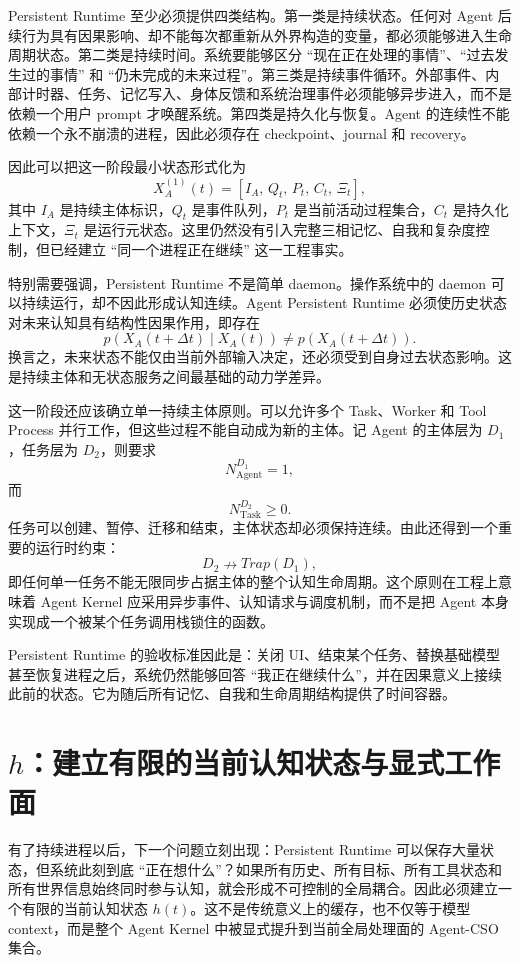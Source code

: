 Persistent Runtime 至少必须提供四类结构。第一类是持续状态。任何对 Agent 后续行为具有因果影响、却不能每次都重新从外界构造的变量，都必须能够进入生命周期状态。第二类是持续时间。系统要能够区分 ``现在正在处理的事情''、``过去发生过的事情'' 和 ``仍未完成的未来过程''。第三类是持续事件循环。外部事件、内部计时器、任务、记忆写入、身体反馈和系统治理事件必须能够异步进入，而不是依赖一个用户 prompt 才唤醒系统。第四类是持久化与恢复。Agent 的连续性不能依赖一个永不崩溃的进程，因此必须存在 checkpoint、journal 和 recovery。

因此可以把这一阶段最小状态形式化为
\[
X_A^{(1)}(t)
=
\left[
I_A,\,
Q_t,\,
P_t,\,
C_t,\,
\Xi_t
\right],
\]
其中 $I_A$ 是持续主体标识，$Q_t$ 是事件队列，$P_t$ 是当前活动过程集合，$C_t$ 是持久化上下文，$\Xi_t$ 是运行元状态。这里仍然没有引入完整三相记忆、自我和复杂度控制，但已经建立 ``同一个进程正在继续'' 这一工程事实。

特别需要强调，Persistent Runtime 不是简单 daemon。操作系统中的 daemon 可以持续运行，却不因此形成认知连续。Agent Persistent Runtime 必须使历史状态对未来认知具有结构性因果作用，即存在
\[
p(X_A(t+\Delta t)\mid X_A(t))
\neq
p(X_A(t+\Delta t)).
\]
换言之，未来状态不能仅由当前外部输入决定，还必须受到自身过去状态影响。这是持续主体和无状态服务之间最基础的动力学差异。

这一阶段还应该确立单一持续主体原则。可以允许多个 Task、Worker 和 Tool Process 并行工作，但这些过程不能自动成为新的主体。记 Agent 的主体层为 $D_1$，任务层为 $D_2$，则要求
\[
N_{\mathrm{Agent}}^{D_1}=1,
\]
而
\[
N_{\mathrm{Task}}^{D_2}\geq 0.
\]
任务可以创建、暂停、迁移和结束，主体状态却必须保持连续。由此还得到一个重要的运行时约束：
\[
D_2\nrightarrow Trap(D_1),
\]
即任何单一任务不能无限同步占据主体的整个认知生命周期。这个原则在工程上意味着 Agent Kernel 应采用异步事件、认知请求与调度机制，而不是把 Agent 本身实现成一个被某个任务调用栈锁住的函数。

Persistent Runtime 的验收标准因此是：关闭 UI、结束某个任务、替换基础模型甚至恢复进程之后，系统仍然能够回答 ``我正在继续什么''，并在因果意义上接续此前的状态。它为随后所有记忆、自我和生命周期结构提供了时间容器。

\section{$h$：建立有限的当前认知状态与显式工作面}

有了持续进程以后，下一个问题立刻出现：Persistent Runtime 可以保存大量状态，但系统此刻到底 ``正在想什么''？如果所有历史、所有目标、所有工具状态和所有世界信息始终同时参与认知，就会形成不可控制的全局耦合。因此必须建立一个有限的当前认知状态 $h(t)$。这不是传统意义上的缓存，也不仅等于模型 context，而是整个 Agent Kernel 中被显式提升到当前全局处理面的 Agent-CSO 集合。

